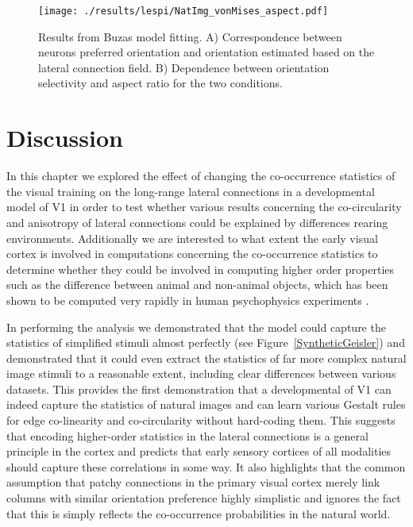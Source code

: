 \begin{figure}
	\centering
        \texttt{[image: ./results/lespi/NatImg\_vonMises\_aspect.pdf]}
	\caption[Results from Buzas model fitting.]{Results from Buzas
      model fitting. A) Correspondence between neurons preferred
      orientation and orientation estimated based on the lateral
      connection field. B) Dependence between orientation selectivity
      and aspect ratio for the two conditions.}
	\label{NatImgvonMisesAspect}
\end{figure}

\section{Discussion}

In this chapter we explored the effect of changing the co-occurrence
statistics of the visual training on the long-range lateral
connections in a developmental model of V1 in order to test whether
various results concerning the co-circularity \citep{Hunt2011} and
anisotropy of lateral connections \citep{Bosking1997} could be
explained by differences rearing environments. Additionally we are
interested to what extent the early visual cortex is involved in
computations concerning the co-occurrence statistics to determine
whether they could be involved in computing higher order properties
such as the difference between animal and non-animal objects, which
has been shown to be computed very rapidly in human psychophysics
experiments \citep{Serre2007b}.

In performing the analysis we demonstrated that the model could
capture the statistics of simplified stimuli almost perfectly (see
Figure~\ref{SyntheticGeisler}) and demonstrated that it could even
extract the statistics of far more complex natural image stimuli to a
reasonable extent, including clear differences between various
datasets. This provides the first demonstration that a developmental
of V1 can indeed capture the statistics of natural images and can
learn various Gestalt rules for edge co-linearity and co-circularity
without hard-coding them. This suggests that encoding higher-order
statistics in the lateral connections is a general principle in the
cortex and predicts that early sensory cortices of all modalities
should capture these correlations in some way. It also highlights that
the common assumption that patchy connections in the primary visual
cortex merely link columns with similar orientation preference highly
simplistic and ignores the fact that this is simply reflects the
co-occurrence probabilities in the natural world.

